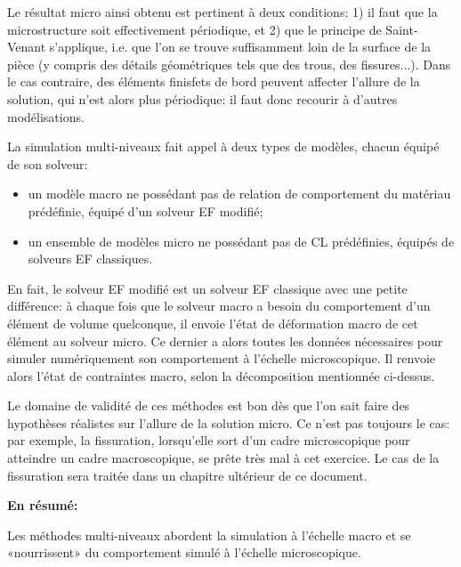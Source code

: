 Le résultat micro ainsi obtenu est pertinent à deux conditions:
1) il faut que la microstructure soit effectivement périodique, et 2) que le principe de
Saint-Venant
s'applique, i.e. que l'on se trouve suffisamment loin de la surface de la pièce
(y compris des détails géométriques tels que des trous, des fissures...).
Dans le cas contraire, des éléments finisfets de bord peuvent affecter l'allure de la solution, qui n'est
alors plus périodique: il faut donc recourir à d'autres modélisations.

\medskip
La simulation multi-niveaux fait appel à deux types de modèles, chacun équipé de son solveur:
\begin{itemize}
  \item un modèle macro ne possédant pas de relation de comportement du matériau
	prédéfinie, équipé d'un solveur EF modifié;
  \item un ensemble de modèles micro ne possédant pas de CL prédéfinies,
	équipés de solveurs EF classiques.
\end{itemize}

En fait, le solveur EF modifié est un solveur EF classique avec une petite différence:
à chaque fois que le solveur macro a besoin du comportement d'un élément de volume
quelconque, il envoie l'état de déformation macro de cet élément au solveur micro.
Ce dernier a alors toutes les données nécessaires pour simuler numériquement son comportement
à l'échelle microscopique. Il renvoie alors l'état de contraintes macro, selon la décomposition
mentionnée ci-dessus.

Le domaine de validité de ces méthodes est bon dès que l'on sait faire des hypothèses
réalistes sur l'allure de la solution micro. Ce n'est pas toujours le cas: par exemple, la fissuration,
lorsqu'elle sort d'un cadre microscopique pour atteindre un cadre macroscopique, se prête
très mal à cet exercice.
Le cas de la fissuration sera traitée dans un chapitre ultérieur de ce document.

\medskip{}
\textbf{En résumé:}

Les méthodes multi-niveaux abordent la simulation à l'échelle macro
et se «nourrissent» du comportement simulé à l'échelle microscopique.


